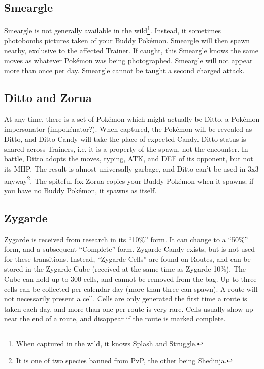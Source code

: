 \subsection{Smeargle\label{subsec:smeargle}}
Smeargle is not generally available in the wild\footnote{When captured in the wild, it knows Splash and Struggle.}.
Instead, it sometimes photobombs pictures taken of your Buddy Pokémon.
Smeargle will then spawn nearby, exclusive to the affected Trainer.
If caught, this Smeargle knows the same moves as whatever Pokémon was being photographed.
Smeargle will not appear more than once per day.
Smeargle cannot be taught a second charged attack.

\subsection{Ditto and Zorua\label{subsec:ditto}}
At any time, there is a set of Pokémon which might actually be Ditto,
  a Pokémon impersonator (impokénator?).
When captured, the Pokémon will be revealed as Ditto, and Ditto Candy will take
  the place of expected Candy.
Ditto status is shared across Trainers, i.e. it is a property of the spawn, not the encounter.
In battle, Ditto adopts the moves, typing, ATK, and DEF of its opponent, but not its MHP\@.
The result is almost universally garbage, and Ditto can't be used in 3x3 anyway\footnote{It is one of two species banned from PvP, the other being Shedinja.}.
The spiteful fox Zorua copies your Buddy Pokémon when it spawns; if you have no Buddy
  Pokémon, it spawns as itself.

\subsection{Zygarde\label{subsec:zygarde}}
Zygarde is received from research in its ``10\%'' form.
It can change to a ``50\%'' form, and a subsequent ``Complete'' form.
Zygarde Candy exists, but is not used for these transitions.
Instead, ``Zygarde Cells'' are found on Routes, and can be stored in the Zygarde Cube
 (received at the same time as Zygarde 10\%).
The Cube can hold up to 300 cells, and cannot be removed from the bag.
Up to three cells can be collected per calendar day (more than three can spawn).
A route will not necessarily present a cell.
Cells are only generated the first time a route is taken each day, and more than one per route is very rare.
Cells usually show up near the end of a route, and disappear if the route is marked complete.

